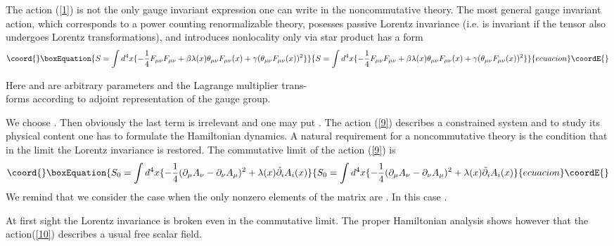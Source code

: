 \documentclass[a4paper,12pt]{article}
\begin{document}
The action (\ref{1}) is not
 the only gauge invariant expression one can write in the noncommutative
 \coordHE{} theory. The most general gauge invariant action, which
 corresponds to a power counting renormalizable theory, posesses passive
 Lorentz invariance (i.e. is invariant if the tensor \myHighlight{$\theta_{\mu \nu}$}\coordHE{}
 also undergoes Lorentz transformations), and introduces nonlocality only
 via star product has a form \begin{equation}\coord{}\boxEquation{ S= \int d^4x \{-
 \frac{1}{4}F_{\mu \nu}F_{\mu \nu}+ \beta \lambda(x) \theta_{\mu
 \nu}F_{\mu \nu}(x)+ \gamma(\theta_{\mu \nu}F_{\mu \nu}(x))^2 \} \label{9}
 }{ S= \int d^4x \{-
 \frac{1}{4}F_{\mu \nu}F_{\mu \nu}+ \beta \lambda(x) \theta_{\mu
 \nu}F_{\mu \nu}(x)+ \gamma(\theta_{\mu \nu}F_{\mu \nu}(x))^2 \} }{ecuacion}\coordE{}\end{equation}

 Here \myHighlight{$\beta$}\coordHE{} and \myHighlight{$\gamma$}\coordHE{} are arbitrary parameters and the
 Lagrange multiplier \coordHE{} trans-\\forms according to adjoint
 representation of the gauge group.

 We choose  \coordHE{}. Then obviously the last term is irrelevant and one
 may put \coordHE{}.  The action (\ref{9}) describes a
 constrained system and to study its physical content one has to formulate
 the Hamiltonian dynamics.  A natural requirement for a noncommutative
 theory is the condition that in the limit \coordHE{} the Lorentz
 invariance is restored. The commutative limit of the action (\ref{9}) is 
  \begin{equation}\coord{}\boxEquation{ 
 S_0= \int d^4x \{- \frac{1}{4}(\partial_{\mu}A_{\nu}- 
 \partial_{\nu}A_{\mu})^2+ \lambda(x) \tilde{\partial}_iA_i(x)
 \label{10} 
}{ 
 S_0= \int d^4x \{- \frac{1}{4}(\partial_{\mu}A_{\nu}- 
 \partial_{\nu}A_{\mu})^2+ \lambda(x) \tilde{\partial}_iA_i(x)
 }{ecuacion}\coordE{}\end{equation}
We remind that we consider the case when the only nonzero 
elements of the matrix \myHighlight{$\theta_{\mu \nu}$}\coordHE{} are \coordHE{}. In this case \coordHE{}.

At first sight the Lorentz invariance is broken even in the commutative 
limit. The proper Hamiltonian analysis shows however that the 
action(\ref{10}) describes a usual free scalar field.
\end{document}
